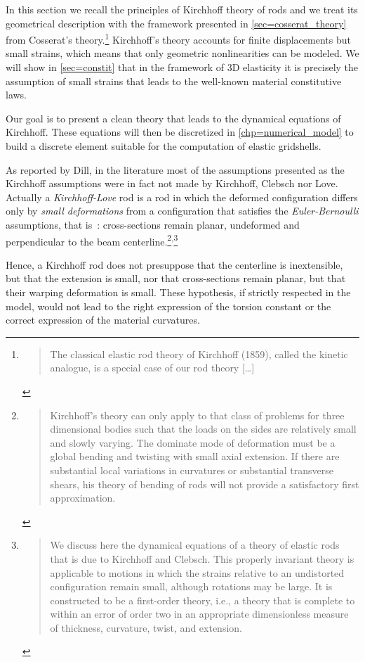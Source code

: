 In this section we recall the principles of Kirchhoff theory of rods and we treat its geometrical description with the framework presented in \cref{sec=cosserat_theory} from Cosserat's theory.\footnote{\blockcquote[p.~238]{Antman2005}{The classical elastic rod theory of Kirchhoff (1859), called the kinetic analogue, is a special case of our rod theory [\dots]}.} Kirchhoff's theory accounts for finite displacements but small strains, which means that only geometric nonlinearities can be modeled. We will show in \cref{sec=constit} that in the framework of 3D elasticity it is precisely the assumption of small strains that leads to the well-known material constitutive laws.

Our goal is to present a clean theory that leads to the dynamical equations of Kirchhoff. These equations will then be discretized in \cref{chp=numerical_model} to build a discrete element suitable for the computation of elastic gridshells.

As reported by Dill, in the literature most of the assumptions presented as the Kirchhoff assumptions were in fact not made by Kirchhoff, Clebsch nor Love. Actually a \emph{Kirchhoff-Love} rod is a rod in which the deformed configuration differs only by \emph{small deformations} from a configuration that satisfies the \emph{Euler-Bernoulli} assumptions, that is~: cross-sections remain planar, undeformed and perpendicular to the beam centerline.\footnote{\blockcquote[p.~18]{Dill1992}{Kirchhoff's theory can only apply to that class of problems for three dimensional bodies such that the loads on the sides are relatively small and slowly varying. The dominate mode of deformation must be a global bending and twisting with small axial extension. If there are substantial local variations in curvatures or substantial transverse shears, his theory of bending of rods will not provide a satisfactory first approximation.}}\textsuperscript{,}\footnote{\blockcquote[p.~1]{Coleman1993}{We discuss here the dynamical equations of a theory of elastic rods that is due to Kirchhoff and Clebsch. This properly invariant theory is applicable to motions in which the strains relative to an undistorted configuration remain small, although rotations may be large. It is constructed to be a first-order theory, i.e., a theory that is complete to within an error of order two in an appropriate dimensionless measure of thickness, curvature, twist, and extension.}}

Hence, a Kirchhoff rod does not presuppose that the centerline is inextensible, but that the extension is small, nor that cross-sections remain planar, but that their warping deformation is small. These hypothesis, if strictly respected in the model, would not lead to the right expression of the torsion constant or the correct expression of the material curvatures.


